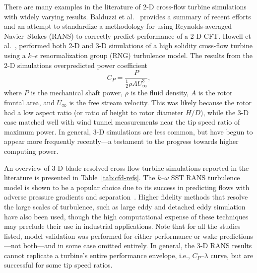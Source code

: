 \documentclass[aip,graphicx]{revtex4-1}
\begin{document}
There are many examples in the literature of 2-D cross-flow turbine simulations
with widely varying results. Balduzzi et al.~\cite{Balduzzi2016} provides a
summary of recent efforts and an attempt to standardize a methodology for using
Reynolds-averaged Navier--Stokes (RANS) to correctly predict performance of a
2-D CFT. Howell et al.~\cite{Howell2010}, performed both 2-D and 3-D simulations
of a high solidity cross-flow turbine using a $k$--$\epsilon$ renormalization
group (RNG) turbulence model. The results from the 2-D simulations overpredicted
power coefficient
\begin{equation}
    C_P = \frac{P}{\frac{1}{2} \rho A U_\infty^3},
    \label{eq:cp}
\end{equation}
where $P$ is the mechanical shaft power, $\rho$ is the fluid density, $A$ is the
rotor frontal area, and $U_\infty$ is the free stream velocity. This was likely
because the rotor had a low aspect ratio (or ratio of height to rotor diameter
$H/D$), while the 3-D case matched well with wind tunnel measurements near the
tip speed ratio of maximum power. In general, 3-D simulations are less common,
but have begun to appear more frequently recently---a testament to the progress
towards higher computing power.

An overview of 3-D blade-resolved cross-flow turbine simulations reported in the
literature is presented in Table~\ref{tab:cfd-refs}. The $k$--$\omega$ SST RANS
turbulence model is shown to be a popular choice due to its success in
predicting flows with adverse pressure gradients and
separation~\cite{Menter2003}. Higher fidelity methods that resolve the large
scales of turbulence, such as large eddy and detached eddy simulation have also
been used, though the high computational expense of these techniques may
preclude their use in industrial applications. Note that for all the studies
listed, model validation was performed for either performance or wake
predictions---not both---and in some case omitted entirely. In general, the 3-D
RANS results cannot replicate a turbine's entire performance envelope, i.e.,
$C_P$--$\lambda$ curve, but are successful for some tip speed ratios.
\end{document}
